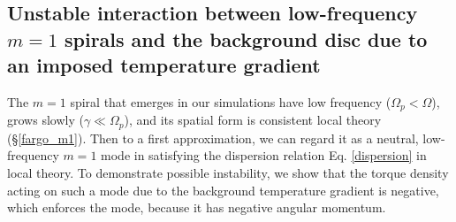 \subsection{Unstable interaction between low-frequency $m=1$ spirals 
  and the background disc due to an imposed temperature gradient}
The $m=1$ spiral that emerges in our simulations have low frequency
($\Omega_p < \Omega$),
grows slowly ($\gamma\ll\Omega_p$), and its spatial form is consistent local theory  
(\S\ref{fargo_m1}). Then to a first approximation, we can regard it 
as a neutral, low-frequency $m=1$ mode in satisfying the 
dispersion relation Eq. \ref{dispersion} in local theory.  %
To demonstrate possible instability, %
we show that the torque density acting on such a mode due to the background
temperature gradient is negative, which enforces the mode, because it
has negative angular momentum.  

